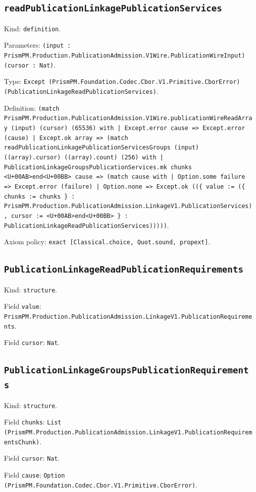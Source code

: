 \documentclass[11pt]{article}
\begin{document}
\subsection*{\texttt{readPublicationLinkagePublicationServices}}
\noindent Kind: \texttt{definition}.\par
\noindent Parameters: \texttt{(input : PrismPM.Production.PublicationAdmission.V1Wire.PublicationWireInput) (cursor : Nat)}.\par
\noindent Type: \texttt{Except (PrismPM.Foundation.Codec.Cbor.V1.Primitive.CborError) (PublicationLinkageReadPublicationServices)}.\par
\noindent Definition: \texttt{(match PrismPM.Production.PublicationAdmission.V1Wire.publicationWireReadArray (input) (cursor) (65536) with | Except.error cause => Except.error (cause) | Except.ok array => (match readPublicationLinkagePublicationServicesGroups (input) ((array).cursor) ((array).count) (256) with | PublicationLinkageGroupsPublicationServices.mk chunks <U+00AB>end<U+00BB> cause => (match cause with | Option.some failure => Except.error (failure) | Option.none => Except.ok ((\{ value := (\{ chunks := chunks \} : PrismPM.Production.PublicationAdmission.LinkageV1.PublicationServices), cursor := <U+00AB>end<U+00BB> \} : PublicationLinkageReadPublicationServices)))))}.\par
\noindent Axiom policy: \texttt{exact [Classical.choice, Quot.sound, propext]}.\par
\subsection*{\texttt{PublicationLinkageReadPublicationRequirements}}
\noindent Kind: \texttt{structure}.\par
\noindent Field \texttt{value}: \texttt{PrismPM.Production.PublicationAdmission.LinkageV1.PublicationRequirements}.\par
\noindent Field \texttt{cursor}: \texttt{Nat}.\par
\subsection*{\texttt{PublicationLinkageGroupsPublicationRequirements}}
\noindent Kind: \texttt{structure}.\par
\noindent Field \texttt{chunks}: \texttt{List (PrismPM.Production.PublicationAdmission.LinkageV1.PublicationRequirementsChunk)}.\par
\noindent Field \texttt{cursor}: \texttt{Nat}.\par
\noindent Field \texttt{cause}: \texttt{Option (PrismPM.Foundation.Codec.Cbor.V1.Primitive.CborError)}.\par
\end{document}
